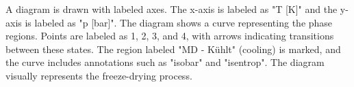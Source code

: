 A diagram is drawn with labeled axes. The x-axis is labeled as "T [K]" and the y-axis is labeled as "p [bar]". The diagram shows a curve representing the phase regions. Points are labeled as 1, 2, 3, and 4, with arrows indicating transitions between these states. The region labeled "MD - Kühlt" (cooling) is marked, and the curve includes annotations such as "isobar" and "isentrop". The diagram visually represents the freeze-drying process.